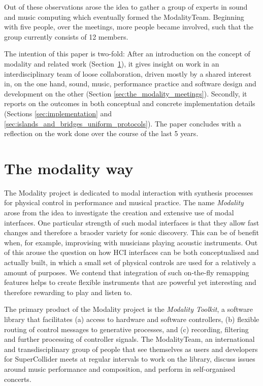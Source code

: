 \documentclass{article}
\begin{document}
Out of these observations arose the idea to gather a group of experts in sound and music computing which eventually formed the ModalityTeam.
Beginning with five people, over the meetings, more people became involved, such that the group currently consists of 12 members.

The intention of this paper is two-fold:
After an introduction on the concept of modality and related work (Section~\ref{sec:modal_control}), it gives insight on work in an interdisciplinary team of loose collaboration, driven mostly by a shared interest in, on the one hand, sound, music, performance practice and software design and development on the other (Section \ref{sec:the_modality_meetings}).
Secondly, it reports on the outcomes in both conceptual and concrete implementation details (Sections \ref{sec:implementation} and \ref{sec:islands_and_bridges_uniform_protocols}).
The paper concludes with a reflection on the work done over the course of the last 5 years.

\section{The modality way}
\label{sec:modal_control}

The Modality project is dedicated to modal interaction with synthesis processes for physical control in performance and musical practice.
The name \emph{Modality} arose from the idea to investigate the creation and extensive use of modal interfaces.
One particular strength of such modal interfaces is that they allow fast changes and therefore a braoder variety for sonic discovery.
This can be of benefit when, for example, improvising with musicians playing acoustic instruments.
Out of this arouse the question on how HCI interfaces can be both conceptualised and actually built, in which a small set of physical controls are used for a relatively a amount of purposes.
We contend that integration of such on-the-fly remapping features helps to create flexible instruments that are powerful yet interesting and therefore rewarding to play and listen to. 

The primary product of the Modality project is the \emph{Modality Toolkit}, a software library that facilitates (a) access to hardware and software controllers, (b) flexible routing of control messages to generative processes, and (c) recording, filtering and further processing of controller signals.
The ModalityTeam, an international and transdisciplinary group of people that see themselves as users and developers for SuperCollider meets at regular intervals to work on the library, discuss issues around music performance and composition, and perform in self-organised concerts.
\end{document}
